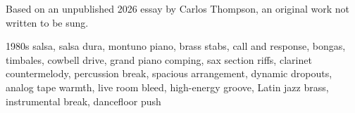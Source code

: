 

\begin{notes}
Based on an unpublished 2026 essay by Carlos Thompson, an original work not written to be sung.
\end{notes}
\begin{style}
1980s salsa, salsa dura, montuno piano, brass stabs, call and response, bongas, timbales, cowbell drive, grand piano comping, sax section riffs, clarinet countermelody, percussion break, spacious arrangement, dynamic dropouts, analog tape warmth, live room bleed, high-energy groove, Latin jazz brass, instrumental break, dancefloor push
\end{style}
